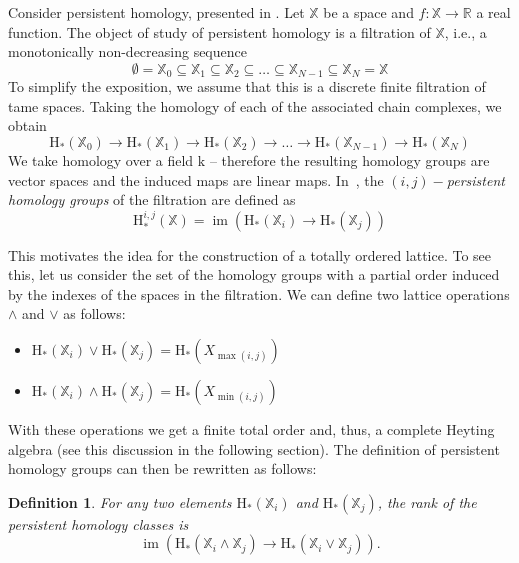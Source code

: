 \documentclass[10pt]{amsart}
\newtheorem{definition}[theorem]{Definition}
\newcommand{\R}{\mathbb{R}}
\newcommand{\X}{\mathbb{X}}
\DeclareMathOperator{\im}{im}
\newcommand{\Hg}{\mathrm{H}}
\newcommand{\rto}{\rightarrow}
\newcommand{\kk}{\mathrm{k}}
\newcommand{\meet}{\wedge}
\newcommand{\join}{\vee}
\begin{document}
Consider persistent homology, presented in \cite{Edel00}. 
Let $\X$ be a space and $f:\X \rto \R$ a real function.  
The object of study of persistent homology is a filtration of $\X$, i.e., a monotonically non-decreasing sequence
%
\begin{equation*}
\emptyset = \X_0 \subseteq \X_1 \subseteq \X_2 \subseteq \ldots\subseteq\X_{N-1} \subseteq \X_N = \X
\end{equation*}
%
To simplify the exposition, we assume that this is a discrete finite filtration of tame spaces. Taking the homology of each of the associated chain complexes, we obtain 
%
\begin{equation*}
 \Hg_*(\X_0) \rto  \Hg_*(\X_1) \rto  \Hg_*(\X_2) \rto \ldots\rto \Hg_*(\X_{N-1}) \rto  \Hg_*(\X_N)
\end{equation*}
%
We take homology over a field $\kk$ -- therefore the resulting homology groups are vector spaces and the induced maps are linear maps. In~\cite{Edel00}, the $(i,j)-$\emph{persistent homology groups}  of the filtration are defined as
%
\begin{equation*} 
\Hg^{i,j}_*(\X) = \im (\Hg_*(\X_i) \rto   \Hg_*(\X_j))
\end{equation*}

This motivates the idea for the construction of a totally ordered lattice.
To see this, let us consider the set of the homology groups with a partial order induced by the indexes of the spaces in the filtration. We can define two lattice operations $\meet$ and $\join$ as follows:
%
\begin{itemize}
\item[] $\Hg_*(\X_i) \join \Hg_*(\X_j) = \Hg_*(X_{\max(i,j) })$
\item[] $\Hg_*(\X_i) \meet \Hg_*(\X_j) = \Hg_*(X_{\min(i,j) })$
\end{itemize}
%
With these operations we get a finite total order and, thus, a complete Heyting algebra (see this discussion in the following section). 
The definition of persistent homology groups can then be rewritten as follows:

\begin{definition}\label{rank}
For any two elements $\Hg_*(\X_i)$ and $ \Hg_*(\X_j)$, the rank of the persistent homology classes is 
\[
\im (\Hg_*(\X_i\meet\X_j) \rto \Hg_*(\X_i\join \X_j)).
\]
\end{definition}


\end{document}
